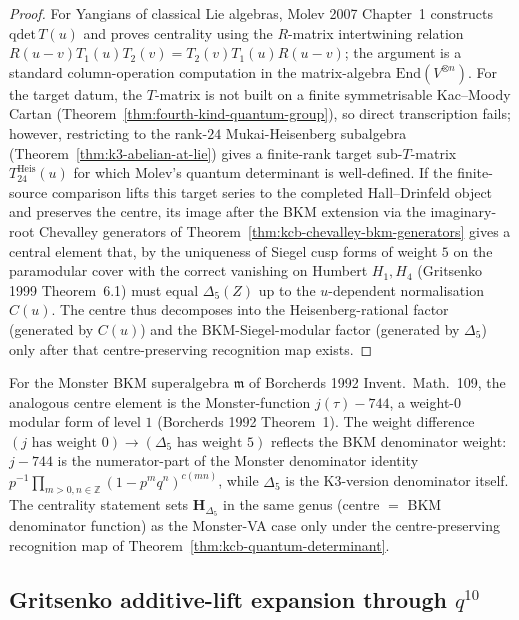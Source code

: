 \begin{proof}
For Yangians of classical Lie algebras, Molev 2007 Chapter~1
constructs $\mathrm{qdet}\,T(u)$ and proves centrality using the
$R$-matrix intertwining relation $R(u-v)T_1(u)T_2(v)=T_2(v)T_1(u)R(u-v)$;
the argument is a standard column-operation computation in the
matrix-algebra $\mathrm{End}(V^{\otimes n})$.
For the target datum, the $T$-matrix is not built on a finite
symmetrisable Kac--Moody Cartan (Theorem~\ref{thm:fourth-kind-quantum-group}),
so direct transcription fails; however, restricting to the rank-$24$
Mukai-Heisenberg subalgebra (Theorem~\ref{thm:k3-abelian-at-lie})
gives a finite-rank target sub-\(T\)-matrix \(T^{\mathrm{Heis}}_{24}(u)\)
for which Molev's quantum determinant is well-defined.  If the
finite-source comparison lifts this target series to the completed
Hall--Drinfeld object and preserves the centre, its image after the BKM
extension via the imaginary-root Chevalley generators of
Theorem~\ref{thm:kcb-chevalley-bkm-generators} gives a central element
that, by the uniqueness of Siegel cusp forms of weight $5$ on the
paramodular cover with the correct vanishing on Humbert $H_1,H_4$
(Gritsenko 1999 Theorem~6.1) must equal $\Delta_5(Z)$ up to the
$u$-dependent normalisation $C(u)$. The centre thus decomposes into
the Heisenberg-rational factor (generated by $C(u)$) and the
BKM-Siegel-modular factor (generated by $\Delta_5$) only after that
centre-preserving recognition map exists.
\end{proof}

\begin{remark}
\label{rem:kcb-monster-analogy}
For the Monster BKM superalgebra $\mathfrak{m}$ of Borcherds 1992
\textup{Invent.~Math.}~109, the analogous centre element is the
Monster-function $j(\tau) - 744$, a weight-$0$ modular form of level
$1$ (Borcherds 1992 Theorem~1). The weight difference $(j \text{ has
weight } 0) \to (\Delta_5 \text{ has weight } 5)$ reflects the BKM
denominator weight: $j-744$ is the numerator-part of the Monster
denominator identity $p^{-1}\prod_{m>0,n\in\mathbb{Z}}(1-p^m q^n)^{c(mn)}$,
while $\Delta_5$ is the K3-version denominator itself. The
centrality statement sets $\mathbf{H}_{\Delta_5}$ in the same genus
(centre $=$ BKM denominator function) as the Monster-VA case only under
the centre-preserving recognition map of
Theorem~\ref{thm:kcb-quantum-determinant}.
\end{remark}

\subsection{Gritsenko additive-lift expansion through \texorpdfstring{$q^{10}$}{q-10}}
\label{subsec:kcb-gritsenko-lift}

